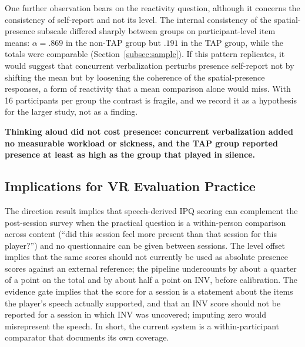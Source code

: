 One further observation bears on the reactivity question, although it concerns the consistency of self-report and not its level. The internal consistency of the spatial-presence subscale differed sharply between groups on participant-level item means: $\alpha=.869$ in the non-TAP group but $.191$ in the TAP group, while the totals were comparable (Section~\ref{subsec:sample}). If this pattern replicates, it would suggest that concurrent verbalization perturbs presence self-report not by shifting the mean but by loosening the coherence of the spatial-presence responses, a form of reactivity that a mean comparison alone would miss. With 16 participants per group the contrast is fragile, and we record it as a hypothesis for the larger study, not as a finding.

\textbf{Thinking aloud did not cost presence: concurrent verbalization added no measurable workload or sickness, and the TAP group reported presence at least as high as the group that played in silence.}

\subsection{Implications for VR Evaluation Practice}

The direction result implies that speech-derived IPQ scoring can complement the post-session survey when the practical question is a within-person comparison across content (``did this session feel more present than that session for this player?'') and no questionnaire can be given between sessions. The level offset implies that the same scores should not currently be used as absolute presence scores against an external reference; the pipeline undercounts by about a quarter of a point on the total and by about half a point on INV, before calibration. The evidence gate implies that the score for a session is a statement about the items the player's speech actually supported, and that an INV score should not be reported for a session in which INV was uncovered; imputing zero would misrepresent the speech. In short, the current system is a within-participant comparator that documents its own coverage.

